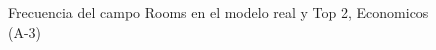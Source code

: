 \begin{figure}[H]
    \centering
    
    \caption{Frecuencia del campo Rooms en el modelo real y Top 2, Economicos (A-3)}
    \label{frecuency-Rooms-top2}
\end{figure}